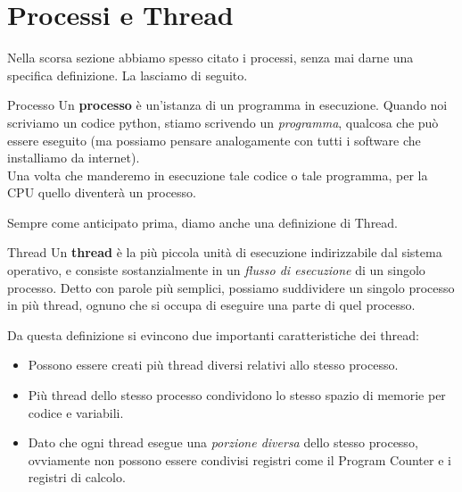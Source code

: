 \documentclass[12pt]{report}
\begin{document}
	\section{Processi e Thread}
	Nella scorsa sezione abbiamo spesso citato i processi, senza mai darne una specifica definizione. La lasciamo di seguito.
	\begin{definizione}{Processo}{}
		Un \textbf{processo} è un'istanza di un programma in esecuzione.
		Quando noi scriviamo un codice python, stiamo scrivendo un \textit{programma}, qualcosa che può essere eseguito (ma possiamo pensare analogamente con tutti i software che installiamo da internet).\\
		Una volta che manderemo in esecuzione tale codice o tale programma, per la CPU quello diventerà un processo.
	\end{definizione}
	
	Sempre come anticipato prima, diamo anche una definizione di Thread.
	\begin{definizione}{Thread}{}
		Un \textbf{thread} è la più piccola unità di esecuzione indirizzabile dal sistema operativo, e consiste sostanzialmente in un \textit{flusso di esecuzione} di un singolo processo.
		Detto con parole più semplici, possiamo suddividere un singolo processo in più thread, ognuno che si occupa di eseguire una parte di quel processo.
	\end{definizione}
	Da questa definizione si evincono due importanti caratteristiche dei thread:
	\begin{itemize}
		\item Possono essere creati più thread diversi relativi allo stesso processo.
		
		\item Più thread dello stesso processo condividono lo stesso spazio di memorie per codice e variabili.
		
		\item Dato che ogni thread esegue una \textit{porzione diversa} dello stesso processo, ovviamente non possono essere condivisi registri come il Program Counter e i registri di calcolo.
	\end{itemize}
	
\end{document}
